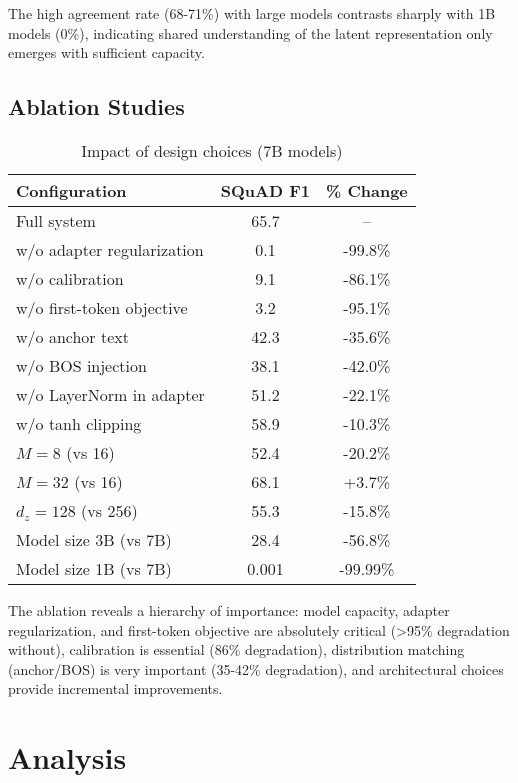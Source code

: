 \documentclass{article}
\begin{document}
The high agreement rate (68-71\%) with large models contrasts sharply with 1B models (0\%), indicating shared understanding of the latent representation only emerges with sufficient capacity.

\subsection{Ablation Studies}

\begin{table}[h]
\caption{Impact of design choices (7B models)}
\label{tab:ablation_extended}
\vskip 0.15in
\begin{center}
\begin{small}
\begin{tabular}{lcc}
\toprule
Configuration & SQuAD F1 & \% Change \\
\midrule
Full system & 65.7 & -- \\
\midrule
w/o adapter regularization & 0.1 & -99.8\% \\
w/o calibration & 9.1 & -86.1\% \\
w/o first-token objective & 3.2 & -95.1\% \\
w/o anchor text & 42.3 & -35.6\% \\
w/o BOS injection & 38.1 & -42.0\% \\
w/o LayerNorm in adapter & 51.2 & -22.1\% \\
w/o tanh clipping & 58.9 & -10.3\% \\
$M=8$ (vs 16) & 52.4 & -20.2\% \\
$M=32$ (vs 16) & 68.1 & +3.7\% \\
$d_z=128$ (vs 256) & 55.3 & -15.8\% \\
Model size 3B (vs 7B) & 28.4 & -56.8\% \\
Model size 1B (vs 7B) & 0.001 & -99.99\% \\
\bottomrule
\end{tabular}
\end{small}
\end{center}
\vskip -0.1in
\end{table}

The ablation reveals a hierarchy of importance: model capacity, adapter regularization, and first-token objective are absolutely critical (>95\% degradation without), calibration is essential (86\% degradation), distribution matching (anchor/BOS) is very important (35-42\% degradation), and architectural choices provide incremental improvements.

\section{Analysis}
\end{document}
